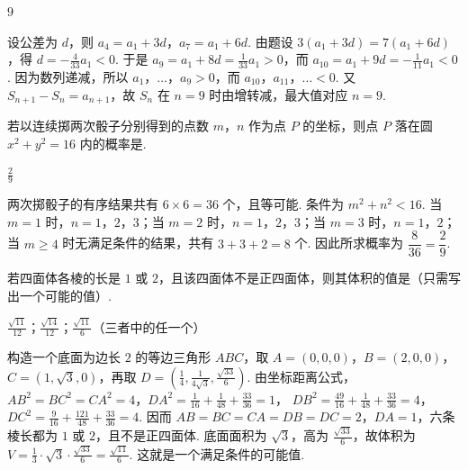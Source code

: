 \documentclass[UTF8,a4paper,oneside,11pt]{ctexbook}
\begin{document}
\begin{answer}
\(9\)
\end{answer}

\begin{solution}
设公差为 \(d\)，则 \(a_{4}=a_{1}+3d\)，\(a_{7}=a_{1}+6d\). 由题设
\(3(a_{1}+3d)=7(a_{1}+6d)\)，得 \(d=-\frac{4}{33}a_{1}<0\). 于是 \(a_{9}=a_{1}+8d=\frac{1}{33}a_{1}>0\)，而 \(a_{10}=a_{1}+9d=-\frac{1}{11}a_{1}<0\). 因为数列递减，所以 \(a_1\)，\(\ldots\)，\(a_9>0\)，而 \(a_{10}\)，\(a_{11}\)，\(\ldots<0\). 又 \(S_{n+1}-S_n=a_{n+1}\)，故 \(S_n\) 在 \(n=9\) 时由增转减，最大值对应 \(n=9\).
\end{solution}

\begin{problem}
若以连续掷两次骰子分别得到的点数 \(m\)，\(n\) 作为点 \(P\) 的坐标，则点 \(P\) 落在圆 \(x^{2} + y^{2} = 16 \) 内的概率是\fillinblank{}.
\end{problem}

\begin{answer}
\(\frac{2}{9}\)
\end{answer}

\begin{solution}
两次掷骰子的有序结果共有 \(6\times6=36\) 个，且等可能. 条件为 \(m^{2}+n^{2}<16\). 当 \(m=1\) 时，\(n=1\)，\(2\)，\(3\)；当 \(m=2\) 时，\(n=1\)，\(2\)，\(3\)；当 \(m=3\) 时，\(n=1\)，\(2\)；当 \(m\geq4\) 时无满足条件的结果，共有 \(3+3+2=8\) 个. 因此所求概率为 \(\dfrac{8}{36}=\dfrac{2}{9}\).
\end{solution}

\begin{problem}
若四面体各棱的长是 \(1\) 或 \(2\)，且该四面体不是正四面体，则其体积的值是（只需写出一个可能的值）\fillinblank{}.
\end{problem}

\begin{answer}
\(\frac{\sqrt{11}}{12}\)；\(\frac{\sqrt{14}}{12}\)；\(\frac{\sqrt{11}}{6}\)（三者中的任一个）
\end{answer}

\begin{solution}
构造一个底面为边长 \(2\) 的等边三角形 \(ABC\)，取
\(A=(0,0,0)\)，\(B=(2,0,0)\)，\(C=(1,\sqrt3,0)\)，再取 \(D=\left(\frac14,\frac{1}{4\sqrt3},\frac{\sqrt{33}}{6}\right)\). 由坐标距离公式，
\(AB^{2}=BC^{2}=CA^{2}=4\)，\(DA^{2}=\frac1{16}+\frac1{48}+\frac{33}{36}=1\)，
\(DB^{2}=\frac{49}{16}+\frac1{48}+\frac{33}{36}=4\)，
\(DC^{2}=\frac9{16}+\frac{121}{48}+\frac{33}{36}=4\). 因而 \(AB=BC=CA=DB=DC=2\)，\(DA=1\)，六条棱长都为 \(1\) 或 \(2\)，且不是正四面体. 底面面积为 \(\sqrt3\)，高为 \(\frac{\sqrt{33}}{6}\)，故体积为
\(V=\frac13\cdot\sqrt3\cdot\frac{\sqrt{33}}{6}=\frac{\sqrt{11}}{6}\). 这就是一个满足条件的可能值.
\end{solution}
\end{document}
